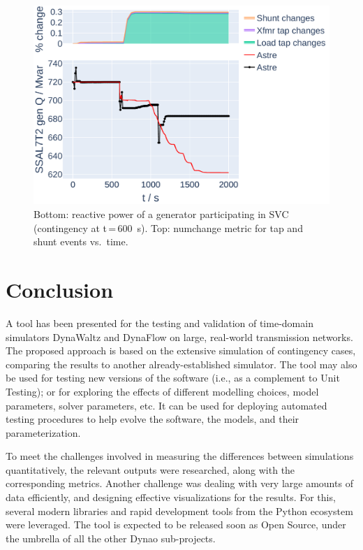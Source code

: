 \documentclass[conference]{IEEEtran}
\newcommand{\Dynawo}{Dyna\textomega o} %
\begin{document}
\begin{figure}
  \centering
  \includegraphics[width=\columnwidth]{figs/Qgen_curve_GENS_20210211-0930_moreT600}
  \caption{Bottom: reactive power of a generator participating in SVC
    (contingency at t\,=\,\SI{600}{s}). Top: numchange metric for tap and shunt
    events vs.\ time.}
  \label{fig:curveplot}
\end{figure}




\section{Conclusion}

A tool has been presented for the testing and validation of time-domain
simulators DynaWaltz and DynaFlow on large, real-world transmission networks.
The proposed approach is based on the extensive simulation of contingency cases,
comparing the results to another already-established simulator. The tool may
also be used for testing new versions of the software (i.e., as a complement to
Unit Testing); or for exploring the effects of different modelling choices,
model parameters, solver parameters, etc.  It can be used for deploying
automated testing procedures to help evolve the software, the models, and their
parameterization.

To meet the challenges involved in measuring the differences between simulations
quantitatively, the relevant outputs were researched, along with the
corresponding metrics. Another challenge was dealing with very large amounts of
data efficiently, and designing effective visualizations for the results. For
this, several modern libraries and rapid development tools from the Python
ecosystem were leveraged.  The tool is expected to be released soon as Open
Source, under the umbrella of all the other \Dynawo{} sub-projects.






\end{document}
